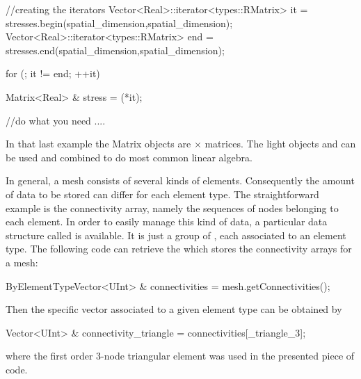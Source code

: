 \begin{cpp}
  //creating the iterators
  Vector<Real>::iterator<types::RMatrix> it  = stresses.begin(spatial_dimension,spatial_dimension);
  Vector<Real>::iterator<types::RMatrix> end = stresses.end(spatial_dimension,spatial_dimension);

  for (; it != end; ++it){
    Matrix<Real> & stress = (*it);

    //do what you need
    ....

  }
\end{cpp}
In that last example the Matrix objects are
 $\times$  matrices.
The light objects  and  can be used and combined
to do most common linear algebra.

In general, a mesh consists of several kinds of elements. Consequently the
amount of data to be stored can differ for each element type. The straightforward
example is the connectivity array, namely the sequences of nodes belonging to
each element. In order to easily manage this kind of data, a
particular data structure called  is available.
It is just a group of , each associated to an element
type. The following code can retrieve the 
which stores the connectivity arrays for a mesh:
\begin{cpp}
  ByElementTypeVector<UInt> & connectivities = mesh.getConnectivities();
\end{cpp}
Then the specific vector associated to a given element type can be
obtained by
\begin{cpp}
  Vector<UInt> & connectivity_triangle = connectivities[_triangle_3];
\end{cpp}
where the first order 3-node triangular element was used in the presented
piece of code.

